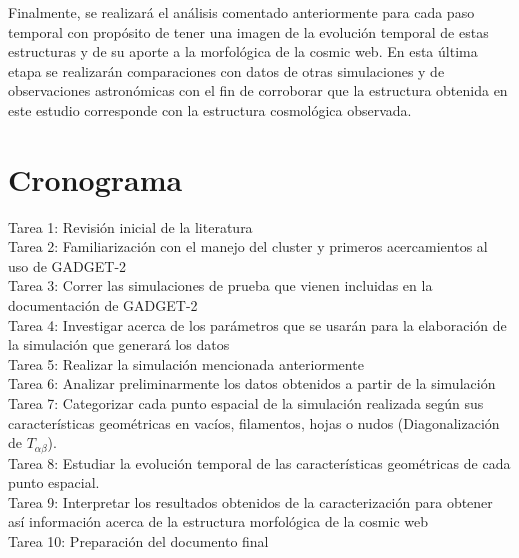 \documentclass{article}
\begin{document}
Finalmente, se realizará el análisis comentado anteriormente para cada
paso temporal con propósito de tener una imagen de la evolución
temporal de estas estructuras y de su aporte a la morfológica de la
cosmic web. En esta última etapa se realizarán comparaciones con datos
de otras simulaciones y de observaciones astronómicas con el fin de
corroborar que la estructura obtenida en este estudio corresponde con
la estructura cosmológica observada.          



\section{Cronograma}

Tarea 1: Revisión inicial de la literatura \\ 
Tarea 2: Familiarización con el manejo del cluster y primeros
acercamientos al uso de GADGET-2 \\ 
Tarea 3: Correr las simulaciones de prueba que vienen incluidas en la
documentación de GADGET-2  \\ 
Tarea 4: Investigar acerca de los parámetros que se usarán para la elaboración de la simulación que generará los datos \\
Tarea 5: Realizar la simulación mencionada anteriormente \\
Tarea 6: Analizar preliminarmente los datos obtenidos a partir de la
simulación \\ 
Tarea 7: Categorizar cada punto espacial de la simulación realizada
según sus características geométricas en vacíos, filamentos, hojas o
nudos (Diagonalización de $T_{\alpha\beta}$). \\ 
Tarea 8: Estudiar la evolución temporal de las características
geométricas de cada punto espacial. \\ 
Tarea 9: Interpretar los resultados obtenidos de la caracterización para obtener así información acerca de la estructura morfológica de la cosmic web \\
Tarea 10: Preparación del documento final \\
\end{document}

